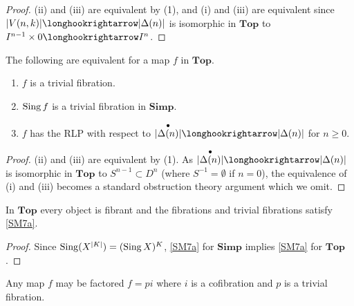 \documentclass[../main]{subfiles}
\begin{document}
\begin{proof}
(ii) and (iii) are equivalent by (1), and (i) and (iii) are equivalent since $|V(n, k)| \longhookrightarrow |\Delta(n)|$ is isomorphic in $\mathbf{Top}$ to $I^{n - 1} \times 0 \longhookrightarrow I^n$. 
\end{proof}

\begin{lemma}
\label{lem:2.3.2}
The following are equivalent for a map $f$ in $\mathbf{Top}$. 
\begin{enumerate}
    \item[(i)] $f$ is a trivial fibration.
    \item[(ii)] $\operatorname{Sing} f$ is a trivial fibration in $\mathbf{Simp}$.
    \item[(iii)] $f$ has the RLP with respect to $|\overset{\bullet}{\Delta(n)}| \longhookrightarrow |\Delta(n)|$ for $n \ge 0$.
\end{enumerate} 
\end{lemma} 

\begin{proof}
(ii) and (iii) are equivalent by (1). As $|\overset{\bullet}{\Delta(n)}| \longhookrightarrow |\Delta(n)|$ is isomorphic in $\mathbf{Top}$ to $S^{n - 1} \subset D^n$ (where $S^{-1} = \emptyset$ if $n = 0$), the equivalence of (i) and (iii) becomes a standard obstruction theory argument which we omit.
\end{proof} 

\begin{corollary*}
In $\mathbf{Top}$ every object is fibrant and the fibrations and trivial fibrations satisfy \ref{SM7a}.
\end{corollary*}

\begin{proof}
Since $\operatorname{Sing}(X^{|K|}) = (\operatorname{Sing} X)^K$, \ref{SM7a} for $\mathbf{Simp}$ implies \ref{SM7a} for $\mathbf{Top}$. 
\end{proof} 

\begin{lemma}
\label{lem:2.3.3}
Any map $f$ may be factored $f = pi$ where $i$ is a cofibration and $p$ is a trivial fibration. 
\end{lemma} 
\end{document}
